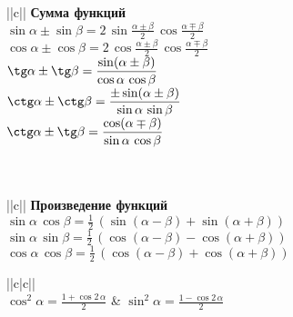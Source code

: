 \begin{tabu}[t]{||c||}
	\hline
		\textbf{Сумма функций} \\
	\hline
	\hline
		$\displaystyle \sin \alpha \pm \sin \beta = 2\, \sin \frac{\alpha \pm \beta}{2}\, \cos \frac{\alpha \mp \beta}{2} $ \\
	\hline
		$\displaystyle \cos \alpha \pm \cos \beta = 2\, \cos \frac{\alpha \pm \beta}{2}\, \cos \frac{\alpha \mp \beta}{2} $ \\
	\hline
		$\displaystyle \tg \alpha \pm \tg \beta = \frac{\sin (\alpha \pm \beta)}{\cos \alpha\, \cos \beta} $ \\
	\hline
		$\displaystyle \ctg \alpha \pm \ctg \beta = \frac{\pm\sin (\alpha \pm \beta)}{\sin \alpha\, \sin \beta} $ \\
	\hline
		$\displaystyle \ctg \alpha \pm \tg \beta = \frac{\cos (\alpha \mp \beta)}{\sin \alpha\, \cos \beta} $ \\
	\hline
		 \\
	\hline
		 \\
	\hline
\end{tabu}

\begin{tabu}[t]{||c||}
	\hline
		\textbf{Произведение функций} \\
	\hline
	\hline
		$\displaystyle \sin \alpha\, \cos \beta = \frac{1}{2}\, (\sin (\alpha - \beta) + \sin (\alpha + \beta)) $ \\
	\hline
		$\displaystyle \sin \alpha\, \sin \beta = \frac{1}{2}\, (\cos (\alpha - \beta) - \cos (\alpha + \beta)) $ \\
	\hline
		$\displaystyle \cos \alpha\, \cos \beta = \frac{1}{2}\, (\cos (\alpha - \beta) + \cos (\alpha + \beta)) $ \\
	\hline
\end{tabu}

\begin{tabu}[t]{||c|c||}
	\hline
		 \\
	\hline
	\hline
		$\displaystyle \cos^2 \alpha = \frac{1 + \cos 2\, \alpha}{2} $ &
		$\displaystyle \sin^2 \alpha = \frac{1 - \cos 2\, \alpha}{2} $ \\
	\hline
		 \\		
	\hline
		 \\
	\hline
		 \\
	\hline
\end{tabu}

